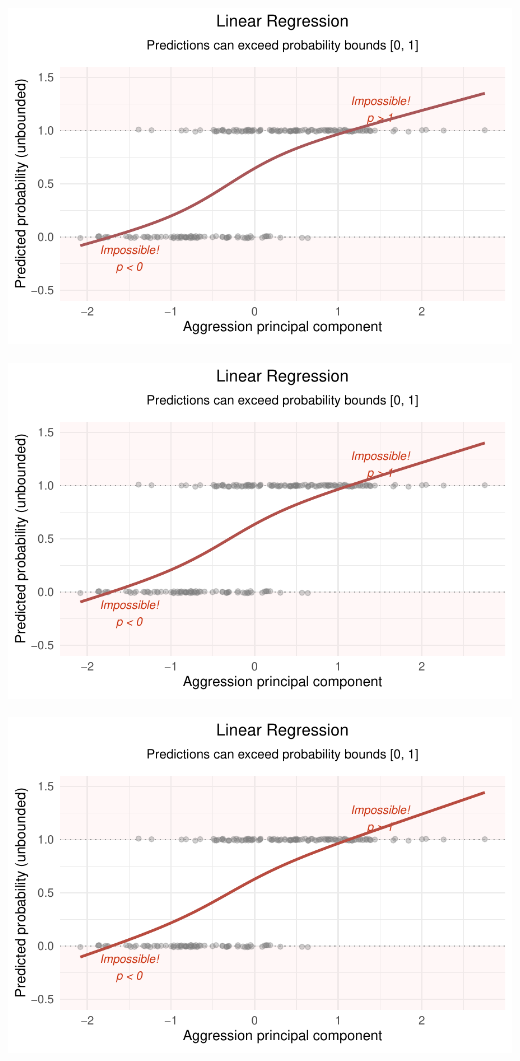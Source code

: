 \documentclass[
  letterpaper,
  DIV=11,
  numbers=noendperiod]{scrartcl}
\begin{document}
\begin{center}
\includegraphics[width=0.8\linewidth,height=\textheight,keepaspectratio]{Beyond!!!_files/figure-pdf/unnamed-chunk-4-87.pdf}
\end{center}

\begin{center}
\includegraphics[width=0.8\linewidth,height=\textheight,keepaspectratio]{Beyond!!!_files/figure-pdf/unnamed-chunk-4-88.pdf}
\end{center}

\begin{center}
\includegraphics[width=0.8\linewidth,height=\textheight,keepaspectratio]{Beyond!!!_files/figure-pdf/unnamed-chunk-4-89.pdf}
\end{center}
\end{document}
